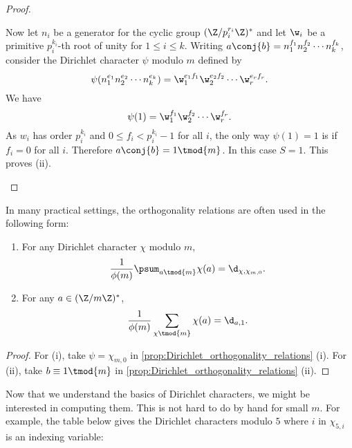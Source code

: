 \begin{proof}
\begin{enumerate}[label=(\roman*)]
\[          \]
          Now let $n_{i}$ be a generator for the cyclic group $(\Z/p_{i}^{r_{i}}\Z)^{\ast}$ and let $\w_{i}$ be a primitive $p_{i}^{k_{i}}$-th root of unity for $1 \le i \le k$. Writing $a\conj{b} = n_{1}^{f_{1}}n_{2}^{f_{2}} \cdots n_{k}^{f_{k}}$, consider the Dirichlet character $\psi$ modulo $m$ defined by
          \[
            \psi(n_{1}^{e_{1}}n_{2}^{e_{2}} \cdots n_{k}^{e_{k}}) = \w_{1}^{e_{1}f_{1}}\w_{2}^{e_{2}f_{2}} \cdots \w_{r}^{e_{r}f_{r}}.
          \]
          We have
          \[
            \psi(1) = \w_{1}^{f_{1}}\w_{2}^{f_{2}} \cdots \w_{r}^{f_{r}}.
          \]
          As $w_{i}$ has order $p_{i}^{k_{i}}$ and $0 \le f_{i} < p_{i}^{k_{i}}-1$ for all $i$, the only way $\psi(1) = 1$ is if $f_{i} = 0$ for all $i$. Therefore $a\conj{b} = 1 \tmod{m}$. In this case $S = 1$. This proves (ii).
        \end{enumerate}
      \end{proof}

      In many practical settings, the orthogonality relations are often used in the following form:

      \begin{corollary}\label{cor:Dirichlet_orthogonality_relations}
      \phantom{ }
        \begin{enumerate}[label=(\roman*)]
          \item For any Dirichlet character $\chi$ modulo $m$,
          \[
            \frac{1}{\phi(m)}\psum_{a \tmod{m}}\chi(a) = \d_{\chi,\chi_{m,0}}.
          \]
          \item For any $a \in (\Z/m\Z)^{\ast}$,
          \[
            \frac{1}{\phi(m)}\sum_{\chi \tmod{m}}\chi(a) = \d_{a,1}.
          \]
        \end{enumerate}
      \end{corollary}
      \begin{proof}
        For (i), take $\psi = \chi_{m,0}$ in \cref{prop:Dirichlet_orthogonality_relations} (i). For (ii), take $b \equiv 1 \tmod{m}$ in \cref{prop:Dirichlet_orthogonality_relations} (ii).
      \end{proof}

      Now that we understand the basics of Dirichlet characters, we might be interested in computing them. This is not hard to do by hand for small $m$. For example, the table below gives the Dirichlet characters modulo $5$ where $i$ in $\chi_{5,i}$ is an indexing variable:

